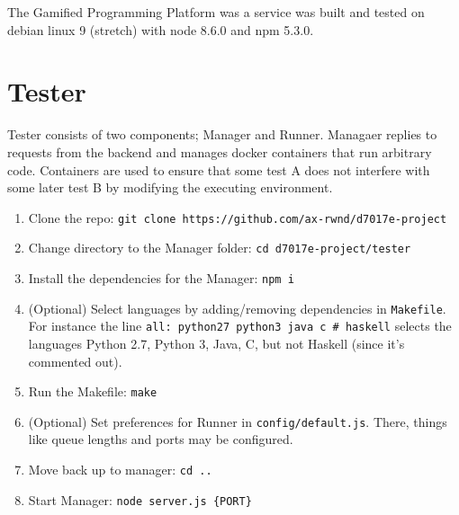 The Gamified Programming Platform was a service was built and tested on debian linux 9 (stretch) with node 8.6.0 and npm 5.3.0.

\section{Tester}
Tester consists of two components; Manager and Runner. Managaer replies to requests from the backend and manages docker containers that run arbitrary code. Containers are used to ensure that some test A does not interfere with some later test B by modifying the executing environment.\\
\begin{enumerate}
    \item Clone the repo: \texttt{git clone https://github.com/ax-rwnd/d7017e-project}
    \item Change directory to the Manager folder: \texttt{cd d7017e-project/tester}
    \item Install the dependencies for the Manager: \texttt{npm i}
    \item (Optional) Select languages by adding/removing dependencies in \texttt{Makefile}. For instance the line \texttt{all: python27 python3 java c \# haskell} selects the languages Python 2.7, Python 3, Java, C, but not Haskell (since it's commented out).
    \item Run the Makefile: \texttt{make}
    \item (Optional) Set preferences for Runner in \texttt{config/default.js}. There, things like queue lengths and ports may be configured.
    \item Move back up to manager: \texttt{cd ..}
    \item Start Manager: \texttt{node server.js \{PORT\}}
\end{enumerate}

